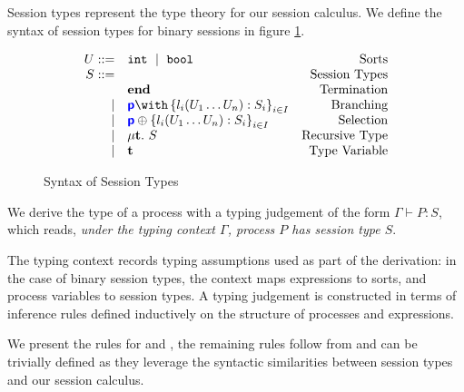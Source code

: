 {Session types} represent the type theory for our session calculus. We define the syntax of session types for binary sessions in figure \ref{fig:bst}. 

\begin{figure}[!hb]
\doublespacing
\[
\begin{array}{rlr}

U ::= & \text{\tt{int}}~\mid~\text{\tt{bool}} & \text{Sorts} \\

S ::= & & \text{Session Types} \\
     & \mathbf{end} & \text{Termination} \\
\mid & \tbra{\role{p}}{l_i(U_1 \dots U_n):S_i}{i\in I} & \text{Branching} \\
\mid & \tsel{\role{p}}{l_i(U_1 \dots U_n):S_i}{i\in I} & \text{Selection} \\
\mid & \mu \mathbf{t}.~S & \text{Recursive Type} \\
\mid & \mathbf{t} & \text{Type Variable} \\
\end{array}
\]

\singlespacing
\caption{Syntax of Session Types}
\label{fig:bst}
\end{figure}

We derive the type of a process with a {typing judgement} of the form $\Gamma \vdash P: S$, which reads, \textit{under the typing context $\Gamma$, process $P$ has session type $S$}. 

The {typing context} records typing assumptions used as part of the derivation: in the case of binary session types, the context maps expressions to sorts, and process variables to session types. A typing judgement is constructed in terms of inference rules defined inductively on the structure of processes and expressions.

We present the rules for  and , the remaining rules follow from \cite{C406Lecture} and can be trivially defined as they leverage the syntactic similarities between session types and our session calculus.

%

